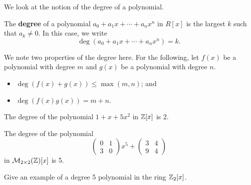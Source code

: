 We look at the notion of the degree of a polynomial.
\begin{definition}
    The \textbf{degree} of a polynomial $a_0+a_1x+\cdots+a_nx^n$ in $R[x]$ is the largest $k$ such that $a_k \neq 0$. In this case, we write
    \[
        \deg(a_0+a_1x+\cdots+a_nx^n) = k.
    \]
\end{definition}
We note two properties of the degree here. For the following, let $f(x)$ be a polynomial with degree $m$ and $g(x)$ be a polynomial with degree $n$.
\begin{itemize}
    \item $\deg(f(x) + g(x)) \leq \max(m,n)$; and
    \item $\deg(f(x)g(x)) = m + n$.
\end{itemize}

\begin{example}
    The degree of the polynomial $1+x+5x^2$ in $\mathbb{Z}[x]$ is 2.
\end{example}
\begin{example}
    The degree of the polynomial
    \[
        \begin{pmatrix}0&1\\3&0\end{pmatrix}x^5 + \begin{pmatrix}3&4\\9&4\end{pmatrix}
    \]
    in $\mathcal{M}_{2\times2}(\mathbb{Z})[x]$ is 5.
\end{example}

\begin{exercise}
    Give an example of a degree 5 polynomial in the ring $\mathbb{Z}_{2}[x]$.
\end{exercise}

